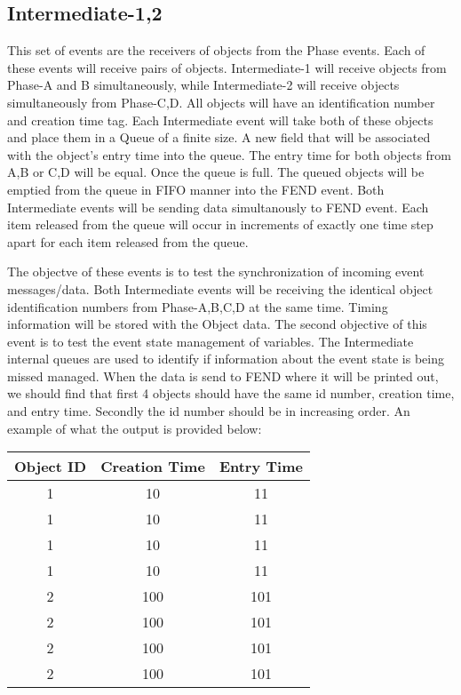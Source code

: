 \subsection{Intermediate-1,2}
This set of events are the receivers of objects 
from the Phase events.  Each of these
events will receive pairs of objects.  Intermediate-1 will receive
objects from Phase-A and B simultaneously, while Intermediate-2
will receive objects simultaneously from Phase-C,D.  All
objects will have an identification number and creation time tag.  
Each Intermediate event will take both of these objects and place them
in a Queue of a finite size. A new field that will be associated
with the object's entry time into the queue.  The entry time for
both objects from A,B or C,D will be equal.
Once the queue is full. The queued objects will be emptied from
the queue in FIFO manner into the FEND event. Both Intermediate
events will be sending data simultanously to FEND event.  Each item
released from the queue will occur in increments of exactly one 
time step apart for each item released from the queue.
 
The objectve of these events is to test the synchronization of
incoming event messages/data. Both Intermediate events will be 
receiving the identical object identification numbers
from Phase-A,B,C,D at the same time. 
Timing information will be stored with the Object data. The second
objective of this event is to test the event state management of variables.
The Intermediate internal queues are used to identify if information about the
event state is being missed managed.  When the data is send to
FEND where it will be printed out, we should find that first 4 objects
should have the same id number, creation time, and entry time.
Secondly the id number should be in increasing order.  An example
of what the output is provided below:

\begin {tabular}{||c|c|c||} \hline
Object ID &   Creation Time &        Entry Time \\ \hline
1   &             10  &                 11 \\
1  &              10  &                11 \\
1  &              10       &          11  \\
1 &               10  &                 11 \\
2 &               100  &               101  \\
2 &               100  &                 101 \\
2 &               100  &                 101 \\
2 &                100  &                 101 \\ \hline
\end {tabular}
 
